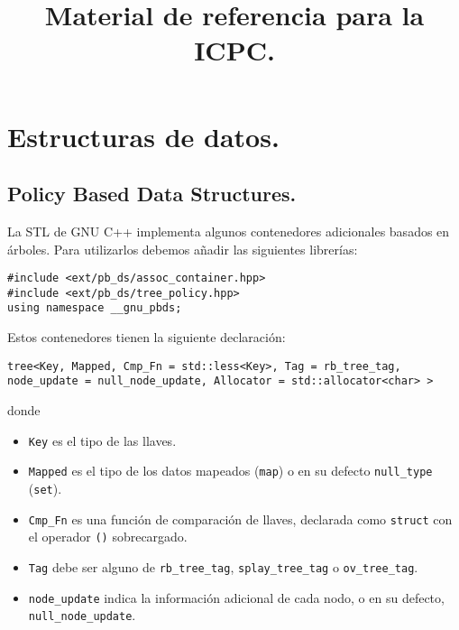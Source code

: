 \documentclass[10pt, letterpaper, twoside]{article}
\title{Material de referencia para la ICPC.}
\author{}
\date{}
\begin{document}
\maketitle

\tableofcontents

\newpage

\section{Estructuras de datos.}

\subsection{Policy Based Data Structures.}

La STL de GNU C++ implementa algunos contenedores adicionales basados en árboles. Para utilizarlos debemos añadir las siguientes librerías:

\begin{lstlisting}
#include <ext/pb_ds/assoc_container.hpp>
#include <ext/pb_ds/tree_policy.hpp>
using namespace __gnu_pbds;
\end{lstlisting}

Estos contenedores tienen la siguiente declaración:

\begin{lstlisting}
tree<Key, Mapped, Cmp_Fn = std::less<Key>, Tag = rb_tree_tag, node_update = null_node_update, Allocator = std::allocator<char> >
\end{lstlisting}

donde
\begin{itemize}
\item \texttt{Key} es el tipo de las llaves.

\item \texttt{Mapped} es el tipo de los datos mapeados (\texttt{map}) o en su defecto \texttt{null\_type} (\texttt{set}).

\item \texttt{Cmp\_Fn} es una función de comparación de llaves, declarada como \texttt{struct} con el operador \texttt{()} sobrecargado.

\item \texttt{Tag} debe ser alguno de \texttt{rb\_tree\_tag}, \texttt{splay\_tree\_tag} o \texttt{ov\_tree\_tag}.

\item \texttt{node\_update} indica la información adicional de cada nodo, o en su defecto, \texttt{null\_node\_update}.
\end{itemize}
\end{document}
